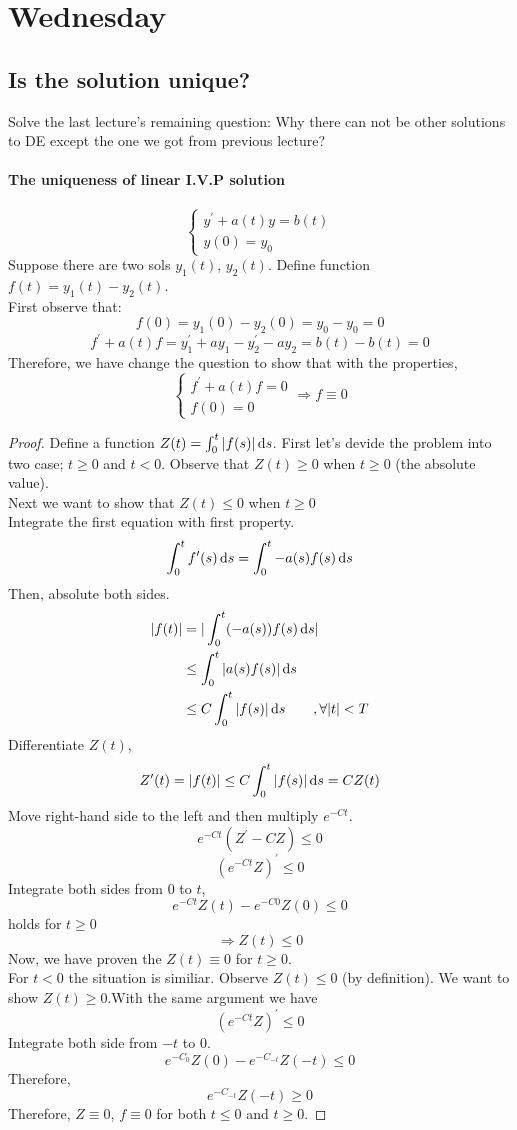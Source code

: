 

\section{Wednesday}
\subsection{Is the solution unique?}
Solve the last lecture's remaining question: Why there can not be other solutions to DE except the one we got from previous lecture?
\paragraph{The uniqueness of linear I.V.P solution}

\[
\left \{	\begin{gathered}
y^\prime+a(t)y=b(t) 	\\
y(0)=y_0
\end{gathered}	\right.
\]
Suppose there are two sols $y_1(t)$, $y_2(t)$. Define function $f(t)=y_1(t)-y_2(t)$.\\ First observe that:
\[f(0)=y_1(0)-y_2(0)=y_0-y_0=0
\]
\[f^{\prime}+a(t)f=y_1^{\prime}+ay_1-y_2^{\prime}-ay_2=b(t)-b(t)=0
\]
Therefore, we have change the question to show that with the properties,
\[
\left \{	\begin{gathered}
f^\prime+a(t)f=0 	\\
f(0)=0
\end{gathered}	 \Rightarrow f\equiv 0 \right.
\]
\begin{proof}
Define a function $Z(t)=\int_0^t |f(s)|\,\mathrm{d} s$. First let's devide the problem into two case; $t\geq0$ and $t<0$. Observe that $Z(t)\geq0$ when $t\geq0$ (the absolute value).\\Next we want to show that $Z(t)\leq0$ when $t\geq0$ \\
Integrate the first equation with first property.
\[\int_0^tf^{\prime}(s)\,\mathrm{d} s=\int_0^t-a(s)f(s)\,\mathrm{d} s
\]
Then, absolute both sides.
\[
\begin{aligned}
	 |f(t)|&=|\int_0^t(-a(s))f(s)\,\mathrm{d} s|  \\
 		&\leq\int_0^t|a(s)f(s)|\,\mathrm{d} s \\
		&\leq C\int_0^t|f(s)|\,\mathrm{d} s\qquad, \forall|t|<T\\	
\end{aligned}
\]
Differentiate $Z(t)$,
\[Z^{\prime}(t)=|f(t)|\leq C\int_0^t|f(s)|\,\mathrm{d} s=CZ(t)
\]
Move right-hand side to the left and then multiply $e^{-Ct}$.
\[e^{-Ct}(Z^{\prime}-CZ)\leq0
\]
\[
(e^{-Ct}Z)^{\prime}\leq0\]
Integrate both sides from $0$ to $t$,
\[e^{-Ct}Z(t)-e^{-C0}Z(0)\leq0\] holds for $t\geq0$
\[\Rightarrow Z(t)\leq0\]
Now, we have proven the $Z(t)\equiv0$ for $t\geq0$.\\
For $t<0$ the situation is similiar. Observe $Z(t)\leq0$ (by definition). We want to show $Z(t)\geq0$.With the same argument we have \[
(e^{-Ct}Z)^{\prime}\leq0\]
Integrate both side from $-t$ to $0$.
\[e^{-C_0}Z(0)-e^{-C_{-t}}Z(-t)\leq0\]
Therefore, \[e^{-C_{-t}}Z(-t)\geq0\]
Therefore, $Z\equiv 0$, $f\equiv 0$ for both $t\leq0$ and $t\geq0$.
\end{proof}
